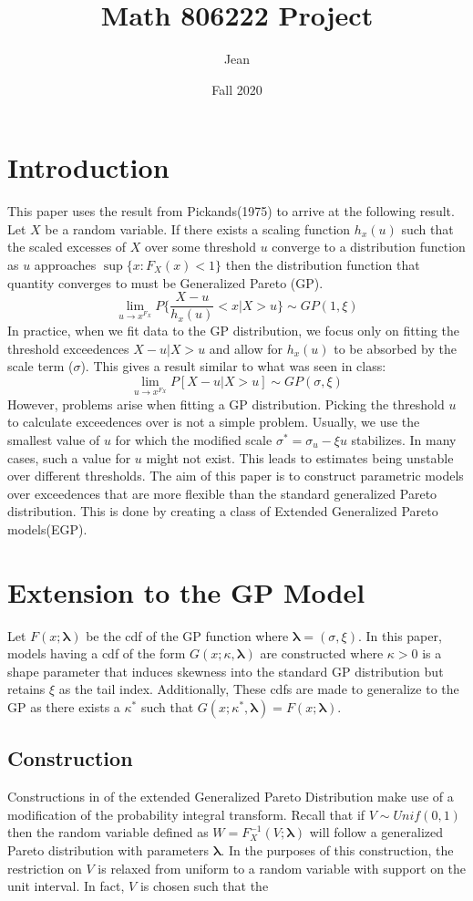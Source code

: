 \documentclass{article}
\title{Math 806222 Project}
\author{Jean }
\date{Fall 2020}
\theoremstyle{definition}
\theoremstyle{definition}
\def\lam{\boldsymbol{\lambda}}
\def\k{\kappa}
\begin{document}
\maketitle
\tableofcontents{}
\pagebreak
\section{Introduction}
This paper uses the result from Pickands(1975) to arrive at the following result. Let $X$ be a random variable. If there exists a scaling function $h_x(u)$ such that the scaled excesses of $X$ over some threshold $u$ converge to a distribution function as $u$ approaches $\sup\{x:F_X(x)<1\}$ then the distribution function that quantity converges to must be Generalized Pareto (GP).
\[\lim_{u\rightarrow x^{F_X}} P\bigg\{\frac{X-u}{h_x(u)}<x|X>u \bigg\}\sim GP(1,\xi)\]
In practice, when we fit data to the GP distribution, we focus only on fitting the threshold exceedences $X-u|X>u$ and allow for $h_x(u)$ to be absorbed by the scale term ($\sigma$). This gives a result similar to what was seen in class:
\[ \lim_{u\rightarrow x^{F_X}} P[X-u|X>u]\sim GP(\sigma, \xi)\]
However, problems arise when fitting a GP distribution. Picking the threshold $u$ to calculate exceedences over is not a simple problem. Usually, we use the smallest value of $u$ for which the modified scale $\sigma^*=\sigma_u-\xi u$ stabilizes. In many cases, such a value for $u$ might not exist. This leads to estimates being unstable over different thresholds. The aim of this paper is to construct parametric models over exceedences that are more flexible than the standard generalized Pareto distribution. This is done by creating a class of Extended Generalized Pareto models(EGP).

\section{Extension to the GP Model}
Let $F(x;\lam)$ be the cdf of the GP function where $\lam=(\sigma, \xi)$. In this paper, models having a cdf of the form $G(x;\k,\lam)$ are constructed where $\k>0$ is a shape parameter that induces skewness into the standard GP distribution but retains $\xi$ as the tail index. Additionally, These cdfs are made to generalize to the GP as there exists a $\k^*$ such that $G(x;\k^*,\lam)= F(x;\lam)$.
\subsection{Construction}
Constructions in of the extended Generalized Pareto Distribution make use of a modification of the probability integral transform. Recall that if $V\sim Unif(0,1)$ then the random variable defined as $W=F_X^{-1}(V;\lam)$ will follow a generalized Pareto distribution with parameters $\lam$. In the purposes of this construction, the restriction on $V$ is relaxed from uniform to a random variable with support on the unit interval. In fact, $V$ is chosen such that the 
\end{document}
